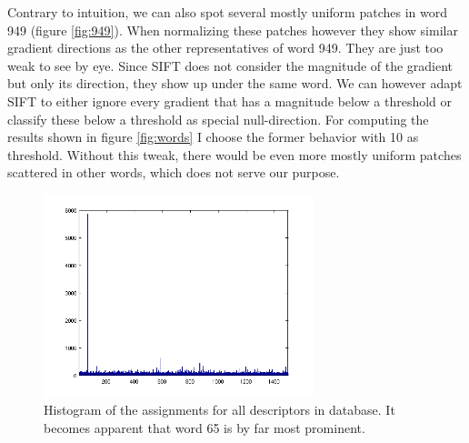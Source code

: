 \documentclass{paper}
\begin{document}
Contrary to intuition, we can also spot several mostly uniform patches in word 949
(figure \ref{fig:949}). When normalizing these patches however they show similar 
gradient directions as the other representatives of word 949. They are just too weak to see
by eye. Since SIFT does not consider the magnitude of the gradient but only its direction,
they show up under the same word. We can however adapt SIFT to either ignore every 
gradient that has a magnitude below a threshold or classify these below a threshold as 
special null-direction. For computing the results shown in figure \ref{fig:words} I 
choose the former behavior with 10 as threshold. 
Without this tweak, there would be even more mostly uniform patches scattered in other words,
which does not serve our purpose.
\begin{figure}
  \centering
  \includegraphics[width=0.7\textwidth]{hist_all}
  \caption{Histogram of the assignments for all descriptors in database. It becomes 
  apparent that word 65 is by far most prominent.}
  \label{fig:all_hist}
\end{figure}
\end{document}
